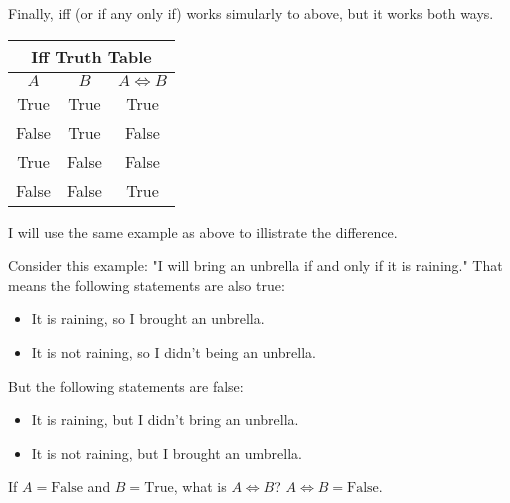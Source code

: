 Finally, iff (or if any only if) works simularly to above, but it works both ways.

\begin{tabular}{c|c|c}
	\hline
	\multicolumn{3}{c}{Iff Truth Table}\\
	\hline
	$A$ & $B$ & $A \iff B$\\
	\hline
	True & True & True\\
	False & True & False\\
	True & False & False\\
	False & False & True\\
	\hline
\end{tabular}

I will use the same example as above to illistrate the difference.

\begin{boxexample}{}{}
	Consider this example: "I will bring an unbrella if and only if it is raining." That means the following statements are also true:
	\begin{itemize}
		\item It is raining, so I brought an unbrella.
		\item It is not raining, so I didn't being an unbrella.
	\end{itemize}
	But the following statements are false:
	\begin{itemize}
		\item It is raining, but I didn't bring an unbrella.
		\item It is not raining, but I brought an umbrella.
	\end{itemize}
\end{boxexample}

\begin{boxexample}{}{}
	If $A=\text{False}$ and $B=\text{True}$, what is $A \iff B$? $A \iff B = \text{False}$.
\end{boxexample}

